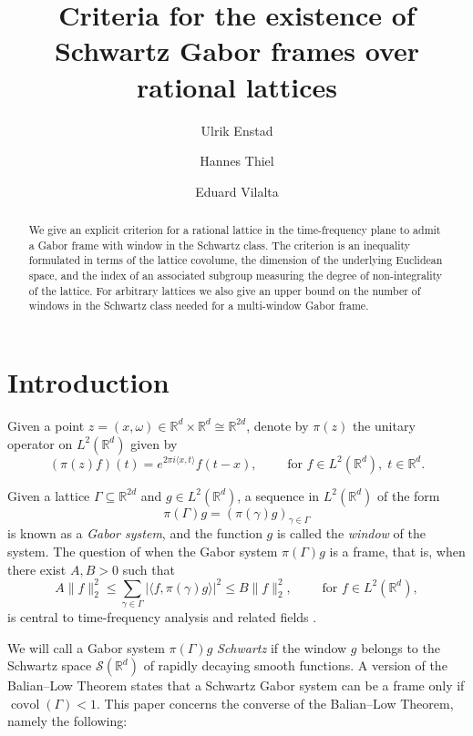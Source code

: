 \documentclass[reqno, a4paper]{amsart}
\title[Gabor frames over rational lattices]{Criteria for the existence of Schwartz Gabor frames over rational lattices}
\author{Ulrik Enstad}
\author{Hannes Thiel}
\author{Eduard Vilalta}
\numberwithin{equation}{section}
\newcommand{\R}{\mathbb{R}}   %
\DeclareMathOperator{\covol}{covol}
\begin{document}
\begin{abstract}
We give an explicit criterion for a rational lattice in the time-frequency plane to admit a Gabor frame with window in the Schwartz class. The criterion is an inequality formulated in terms of the lattice covolume, the dimension of the underlying Euclidean space, and the index of an associated subgroup measuring the degree of non-integrality of the lattice. For arbitrary lattices we also give an upper bound on the number of windows in the Schwartz class needed for a multi-window Gabor frame.
\end{abstract}

\maketitle

\section{Introduction}

Given a point $z = (x,\omega) \in \R^d \times \R^d \cong \R^{2d}$, denote by $\pi(z)$ the unitary operator on $L^2(\R^d)$ given by
\begin{equation}
\label{eq:time-frequency-shift}
(\pi(z)f)(t) 
= e^{2\pi i \langle x, t \rangle}f(t-x), 
\qquad \text{ for } f \in L^2(\R^d), \; t \in \R^d. 
\end{equation}

Given a lattice $\Gamma \subseteq \R^{2d}$ and $g \in L^2(\R^d)$, a sequence in $L^2(\R^d)$ of the form
\[ 
\pi(\Gamma)g = (\pi(\gamma)g)_{\gamma \in \Gamma} 
\]
is known as a \emph{Gabor system}, and the function $g$ is called the \emph{window} of the system.
The question of when the Gabor system $\pi(\Gamma)g$ is a frame, that is, when there exist $A,B > 0$ such that
\[ 
A \| f \|_2^2 \leq \sum_{\gamma \in \Gamma}|\langle f, \pi(\gamma)g \rangle|^2 \leq B \| f \|_2^2, 
\qquad \text{ for } f \in L^2(\R^d),
\]
is central to time-frequency analysis and related fields \cite{gr01}.

We will call a Gabor system $\pi(\Gamma)g$ \emph{Schwartz} if the window $g$ belongs to the Schwartz space $\mathcal{S}(\R^d)$ of rapidly decaying smooth functions. 
A version of the Balian--Low Theorem \cite{balian,low,feka04} states that a Schwartz Gabor system can be a frame only if $\covol(\Gamma) < 1$. 
This paper concerns the converse of the Balian--Low Theorem, namely the following:
\end{document}
